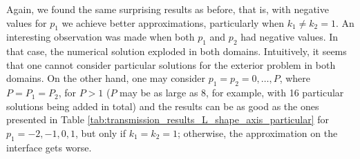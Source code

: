 


Again, we found the same surprising results as before, that is, with negative values for \(p_1\) we achieve better approximations, particularly when \(k_1 \neq k_2 = 1\). An interesting observation was made when both \(p_1\) and \(p_2\) had negative values. In that case, the numerical solution exploded in both domains. Intuitively, it seems that one cannot consider particular solutions for the exterior problem in both domains. On the other hand, one may consider \(p_1 = p_2 = 0, \dots, P\), where \(P=P_1=P_2\), for \(P > 1\) (\(P\) may be as large as 8, for example, with 16 particular solutions being added in total) and the results can be as good as the ones presented in Table \ref{tab:transmission_results_L_shape_axis_particular} for \(p_1=-2, -1, 0, 1\), but only if \(k_1=k_2=1\); otherwise, the approximation on the interface gets worse.

